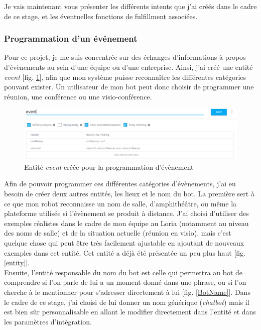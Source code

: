 \documentclass[stage2a]{tnreport} %
\begin{document}
Je vais maintenant vous présenter les différents intents que j'ai créés dans le cadre de ce stage, et les éventuelles fonctions de fulfillment associées.

\subsubsection{Programmation d'un événement}

Pour ce projet, je me suis concentrée sur des échanges d'informations à propos d'évènements au sein d'une équipe ou d'une entreprise. Ainsi, j'ai créé une entité \emph{event} [fig. \ref{event}], afin que mon système puisse reconnaître les différentes catégories pouvant exister. Un utilisateur de mon bot peut donc choisir de programmer une réunion, une conférence ou une visio-conférence.\\

\begin{figure}[h!]
    \centering
    \includegraphics[width=\textwidth]{figures/entities2.PNG}
    \caption{Entité \emph{event} créée pour la programmation d'évènement}
    \label{event}
\end{figure}

\vspace{\linewidth}
Afin de pouvoir programmer ces différentes catégories d'évènements, j'ai eu besoin de créer deux autres entités, les lieux et le nom du bot. La première sert à ce que mon robot reconnaisse un nom de salle, d'amphithéâtre, ou même la plateforme utilisée si l'évènement se produit à distance. J'ai choisi d'utiliser des exemples réalistes dans le cadre de mon équipe au Loria (notamment au niveau des noms de salle) et de la situation actuelle (réunion en visio), mais c'est quelque chose qui peut être très facilement ajustable en ajoutant de nouveaux exemples dans cet entité. Cet entité a déjà été présentée un peu plus haut [fig. \ref{entity}].\\

Ensuite, l'entité responsable du nom du bot est celle qui permettra au bot de comprendre si l'on parle de lui a un moment donné dans une phrase, ou si l'on cherche à le mentionner pour s'adresser directement à lui [fig. \ref{BotName}]. Dans le cadre de ce stage, j'ai choisi de lui donner un nom générique (\emph{chatbot}) mais il est bien sûr personnalisable en allant le modifier directement dans l'entité et dans les paramètres d'intégration.\\
\end{document}
